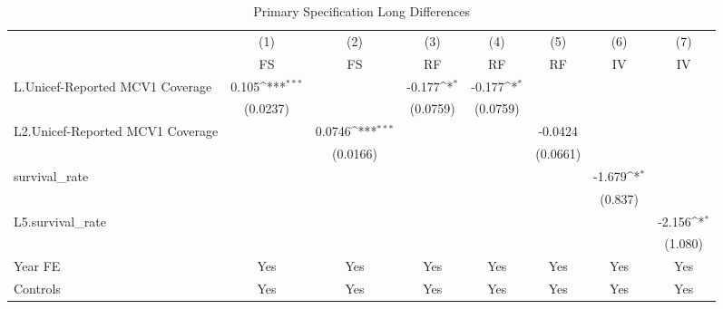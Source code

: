 \begin{table}[htbp]\centering
\def\sym#1{\ifmmode^{#1}\else\(^{#1}\)\fi}
\caption{Primary Specification Long Differences}
\begin{tabular}{l*{7}{c}}
\toprule
                &\multicolumn{1}{c}{(1)}&\multicolumn{1}{c}{(2)}&\multicolumn{1}{c}{(3)}&\multicolumn{1}{c}{(4)}&\multicolumn{1}{c}{(5)}&\multicolumn{1}{c}{(6)}&\multicolumn{1}{c}{(7)}\\
                &\multicolumn{1}{c}{FS}&\multicolumn{1}{c}{FS}&\multicolumn{1}{c}{RF}&\multicolumn{1}{c}{RF}&\multicolumn{1}{c}{RF}&\multicolumn{1}{c}{IV}&\multicolumn{1}{c}{IV}\\
\midrule
L.Unicef-Reported MCV1 Coverage&    0.105\sym{***}&                  &   -0.177\sym{*}  &   -0.177\sym{*}  &                  &                  &                  \\
                & (0.0237)         &                  & (0.0759)         & (0.0759)         &                  &                  &                  \\
\addlinespace
L2.Unicef-Reported MCV1 Coverage&                  &   0.0746\sym{***}&                  &                  &  -0.0424         &                  &                  \\
                &                  & (0.0166)         &                  &                  & (0.0661)         &                  &                  \\
\addlinespace
survival\_rate   &                  &                  &                  &                  &                  &   -1.679\sym{*}  &                  \\
                &                  &                  &                  &                  &                  &  (0.837)         &                  \\
\addlinespace
L5.survival\_rate&                  &                  &                  &                  &                  &                  &   -2.156\sym{*}  \\
                &                  &                  &                  &                  &                  &                  &  (1.080)         \\
\addlinespace
Year FE         &      Yes         &      Yes         &      Yes         &      Yes         &      Yes         &      Yes         &      Yes         \\
\addlinespace
Controls        &      Yes         &      Yes         &      Yes         &      Yes         &      Yes         &      Yes         &      Yes         \\

\end{tabular}
\end{table}
